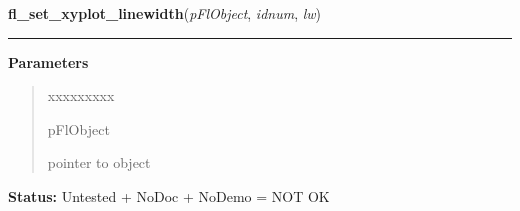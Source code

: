     \label{xformslib:flxyplot:fl_set_xyplot_linewidth}

    \vspace{0.5ex}

\hspace{.8\funcindent}\begin{boxedminipage}{\funcwidth}

    \raggedright \textbf{fl\_set\_xyplot\_linewidth}(\textit{pFlObject}, \textit{idnum}, \textit{lw})

    \vspace{-1.5ex}

    \rule{\textwidth}{0.5\fboxrule}
\setlength{\parskip}{2ex}
\setlength{\parskip}{1ex}
      \textbf{Parameters}
      \vspace{-1ex}

      \begin{quote}
        \begin{Ventry}{xxxxxxxxx}

          \item[pFlObject]

          pointer to object

        \end{Ventry}

      \end{quote}

\textbf{Status:} Untested + NoDoc + NoDemo = NOT OK



    \end{boxedminipage}

    \label{xformslib:flxyplot:fl_set_xyplot_xgrid}

    \vspace{0.5ex}

